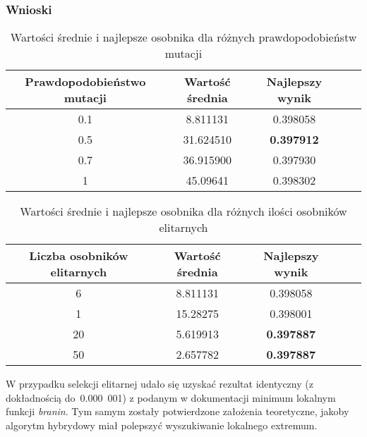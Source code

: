 \vline

\subsubsection{Wnioski}

\begin{table}[!h]
	\hspace*{-1.5in}
	\centering
	\caption{Wartości średnie i najlepsze osobnika dla różnych prawdopodobieństw mutacji}
	\label{mut_alg_hyb}
	\hspace*{-0.4in}
	\begin{tabular}{|c|c|c|c|c|}
		\hline
		\textbf{Prawdopodobieństwo mutacji} & \textbf{Wartość średnia} & \textbf{Najlepszy wynik} \\ \hline
		
		0.1 & 8.811131 & 0.398058 \\
		0.5 & 31.624510 & \textbf{{\color{green} 0.397912 }} \\
		0.7 & 36.915900 & 0.397930 \\
		1   & 45.09641 & 0.398302 \\ \hline      
	\end{tabular}
\end{table}


\begin{table}[!h]
	\hspace*{-1.5in}
	\centering
	\caption{Wartości średnie i najlepsze osobnika dla różnych ilości osobników elitarnych}
	\label{sel_alg_hyb}
	\hspace*{-0.4in}
	\begin{tabular}{|c|c|c|c|c|}
		\hline
		\textbf{Liczba osobników elitarnych} & \textbf{Wartość średnia} & \textbf{Najlepszy wynik} \\ \hline
		
		6  & 8.811131 & 0.398058 \\
		1  & 15.28275 & 0.398001 \\
		20 & 5.619913 & \textbf{{\color{green} 0.397887}} \\
		50 & 2.657782 & \textbf{{\color{green} 0.397887}} \\ \hline      
	\end{tabular}
\end{table}

W przypadku selekcji elitarnej udało się uzyskać rezultat identyczny (z dokładnością \mbox{do 0.000 001)} z podanym w dokumentacji minimum lokalnym funkcji \textit{branin}. Tym samym zostały potwierdzone założenia teoretyczne, jakoby algorytm hybrydowy miał polepszyć wyszukiwanie lokalnego extremum.